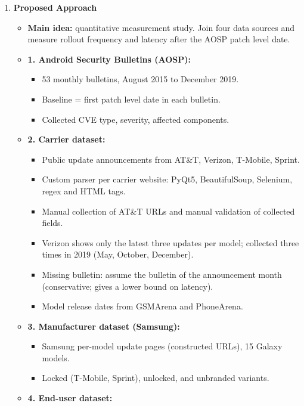 \documentclass[11pt,a4paper]{article}
\newcommand{\entrypart}[1]{\textbf{\color{accent}#1}\par\vspace{2pt}}
\begin{document}
\begin{enumerate}
    \item \entrypart{Proposed Approach}
    \begin{itemize}[leftmargin=*, itemsep=1pt, topsep=2pt]
        \item \textbf{Main idea:} quantitative measurement study. Join four data sources and measure rollout frequency and latency after the AOSP patch level date.
        \item \textbf{1. Android Security Bulletins (AOSP):}
        \begin{itemize}[itemsep=0pt]
            \item 53 monthly bulletins, August 2015 to December 2019.
            \item Baseline = first patch level date in each bulletin.
            \item Collected CVE type, severity, affected components.
        \end{itemize}
        \item \textbf{2. Carrier dataset:}
        \begin{itemize}[itemsep=0pt]
            \item Public update announcements from AT\&T, Verizon, T-Mobile, Sprint.
            \item Custom parser per carrier website: PyQt5, BeautifulSoup, Selenium, regex and HTML tags.
            \item Manual collection of AT\&T URLs and manual validation of collected fields.
            \item Verizon shows only the latest three updates per model; collected three times in 2019 (May, October, December).
            \item Missing bulletin: assume the bulletin of the announcement month (conservative; gives a lower bound on latency).
            \item Model release dates from GSMArena and PhoneArena.
        \end{itemize}
        \item \textbf{3. Manufacturer dataset (Samsung):}
        \begin{itemize}[itemsep=0pt]
            \item Samsung per-model update pages (constructed URLs), 15 Galaxy models.
            \item Locked (T-Mobile, Sprint), unlocked, and unbranded variants.
        \end{itemize}
        \item \textbf{4. End-user dataset:}
        \begin{itemize}[itemsep=0pt]

\end{itemize}
\end{itemize}
\end{enumerate}
\end{document}
